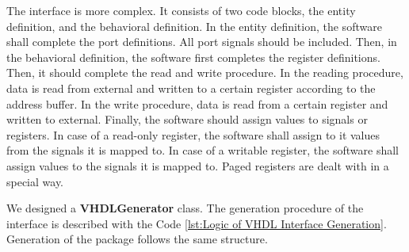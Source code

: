 The interface is more complex. It consists of two code blocks, the entity definition, and the behavioral definition. In the entity definition, the software shall complete the port definitions. All port signals should be included. Then, in the behavioral definition, the software first completes the register definitions. Then, it should complete the read and write procedure. In the reading procedure, data is read from external and written to a certain register according to the address buffer. In the write procedure, data is read from a certain register and written to external. Finally, the software should assign values to signals or registers. In case of a read-only register, the software shall assign to it values from the signals it is mapped to. In case of a writable register, the software shall assign values to the signals it is mapped to. Paged registers are dealt with in a special way.

We designed a \textbf{VHDLGenerator} class. The generation procedure of the interface is described with the Code \ref{lst:Logic of VHDL Interface Generation}. Generation of the package follows the same structure.

